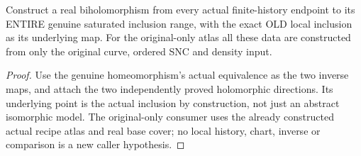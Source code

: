 \begin{theorem}
\label{hir:sharp-actual-endpoint-local-range-biholomorphism}
\leanok
{}
Construct a real biholomorphism from every actual finite-history endpoint
to its ENTIRE genuine saturated inclusion range, with the exact OLD local
inclusion as its underlying map. For the original-only atlas all these data
are constructed from only the original curve, ordered SNC and density input.
\end{theorem}
\begin{proof}
Use the genuine homeomorphism's actual equivalence as the two inverse maps,
and attach the two independently proved holomorphic directions. Its underlying
point is the actual inclusion by construction, not just an abstract isomorphic
model. The original-only consumer uses the already constructed actual recipe
atlas and real base cover; no local history, chart, inverse or comparison is a
new caller hypothesis.
\end{proof}

